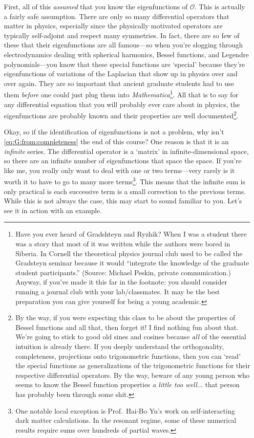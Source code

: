 \documentclass[
  11pt,
	colorful,
	raggedright,
]{tufte-style-thesis-flip}
\begin{document}
First, all of this \emph{assumed} that you know the eigenfunctions of $\mathcal O$. This is actually a fairly safe assumption. There are only so many differential operators that matter in physics, especially since the physically motivated operators are typically self-adjoint and respect many symmetries. In fact, there are so few of these that their eigenfunctions are all famous---so when you're slogging through electrodynamics dealing with spherical harmonics, Bessel functions, and Legendre polynomials---you know that these special functions are `special' because they're eigenfunctions of variations of the Laplacian that show up in physics over and over again. They are so important that ancient graduate students had to use them \emph{before} one could just plug them into \emph{Mathematica}\footnote{Have you ever heard of Gradshteyn and Ryzhik? When I was a student there was a story that most of it was written while the authors were bored in Siberia. In Cornell the theoretical physics journal club used to be called the Gradsteyn seminar because it would ``integrate the knowledge of the graduate student participants.'' (Source: Michael Peskin, private communication.) Anyway, if you've made it this far in the footnote: you should consider running a journal club with your lab/classmates. It may be the best preparation you can give yourself for being a young academic.}. All that is to say for any differential equation that you will probably ever care about in physics, the eigenfunctions are probably known and their properties are well documented\footnote{By the way, if you were expecting this class to be about the properties of Bessel functions and all that, then forget it! I find nothing fun about that. We're going to stick to good old sines and cosines because \emph{all} of the essential intuition is already there. If you deeply understand the orthogonality, completeness, projections onto trigonometric functions, then you can `read' the special functions as generalizations of the trigonometric functions for their respective differential operators. By the way, beware of any young person who seems to know the Bessel function properties \emph{a little too well}... that person has probably been through some shit.}. 

Okay, so if the identification of eigenfunctions is not a problem, why isn't \eqref{eq:G:from:completeness} the end of this course? One reason is that it is an \emph{infinite} series. The differential operator is a `matrix' in  infinite-dimensional space, so there are an infinite number of eigenfunctions that space the space. If you're like me, you really only want to deal with one or two terms---very rarely is it worth it to have to go to many more terms\footnote{One notable local exception is Prof.~Hai-Bo Yu's work on self-interacting dark matter calculations. In the resonant regime, some of these numerical results require sums over hundreds of partial waves.}. This means that the infinite sum is only practical is each successive term is a small correction to the previous terms. While this is not always the case, this may start to sound familiar to you. Let's see it in action with an example.
\end{document}
